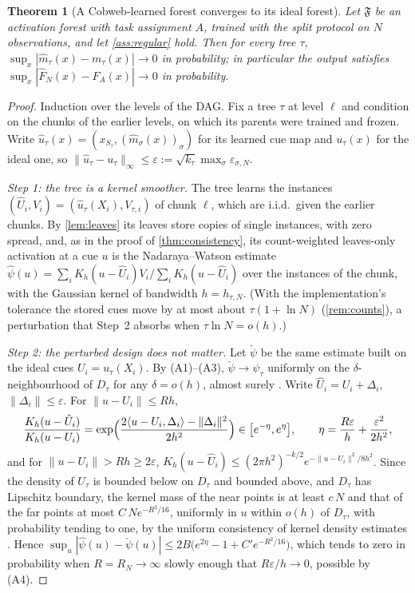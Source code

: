 \documentclass[11pt]{article}
\newtheorem{theorem}{Theorem}
\theoremstyle{definition}
\theoremstyle{remark}
\newcommand{\F}{\mathfrak{F}}
\begin{document}
\begin{theorem}[A Cobweb-learned forest converges to its ideal forest]\label{thm:ideal}
Let $\F$ be an activation forest with task assignment $A$, trained with the split
protocol on $N$ observations, and let \cref{ass:regular} hold.  Then for every tree
$\tau$, $\sup_x|\hat m_\tau(x)-m_\tau(x)|\to0$ in probability; in particular the output
satisfies $\sup_x|\hat F_N(x)-F_A(x)|\to0$ in probability.
\end{theorem}
\begin{proof}
Induction over the levels of the DAG.  Fix a tree $\tau$ at level $\ell$ and condition on
the chunks of the earlier levels, on which its parents were trained and frozen.  Write
$\hat u_\tau(x)=(x_{S_\tau},(\hat m_\sigma(x))_\sigma)$ for its learned cue map and
$u_\tau(x)$ for the ideal one, so $\|\hat u_\tau-u_\tau\|_\infty\le\varepsilon:=
\sqrt{k_\tau}\max_\sigma\varepsilon_{\sigma,N}$.

\emph{Step 1: the tree is a kernel smoother.}  The tree learns the instances
$(\hat U_i,V_i)=(\hat u_\tau(X_i),V_{\tau,i})$ of chunk $\ell$, which are i.i.d.\ given
the earlier chunks.  By \cref{lem:leaves} its leaves store copies of single instances,
with zero spread, and, as in the proof of \cref{thm:consistency}, its count-weighted
leaves-only activation at a cue $u$ is the Nadaraya--Watson estimate
$\hat\psi(u)=\sum_iK_h(u-\hat U_i)V_i/\sum_iK_h(u-\hat U_i)$ over the instances of the
chunk, with the Gaussian kernel of bandwidth $h=h_{\tau,N}$.  (With the implementation's
tolerance the stored cues move by at most about $\tau(1+\ln N)$ (\cref{rem:counts}), a
perturbation that Step~2 absorbs when $\tau\ln N=o(h)$.)

\emph{Step 2: the perturbed design does not matter.}  Let $\check\psi$ be the same
estimate built on the ideal cues $U_i=u_\tau(X_i)$.  By (A1)--(A3), $\check\psi\to\psi_\tau$
uniformly on the $\delta$-neighbourhood of $D_\tau$ for any $\delta=o(h)$, almost surely
\citep{devroye1978,mack1982}.  Write $\hat U_i=U_i+\Delta_i$, $\|\Delta_i\|\le\varepsilon$.
For $\|u-U_i\|\le Rh$,
\[
  \frac{K_h(u-\hat U_i)}{K_h(u-U_i)}=\exp\Bigl(\frac{2\langle u-U_i,\Delta_i\rangle-\|\Delta_i\|^2}{2h^2}\Bigr)
  \in\bigl[e^{-\eta},e^{\eta}\bigr],\qquad \eta=\frac{R\varepsilon}{h}+\frac{\varepsilon^2}{2h^2},
\]
and for $\|u-U_i\|>Rh\ge2\varepsilon$, $K_h(u-\hat U_i)\le(2\pi h^2)^{-k/2}
e^{-\|u-U_i\|^2/8h^2}$.  Since the density of $U_\tau$ is bounded below on $D_\tau$ and
bounded above, and $D_\tau$ has Lipschitz boundary, the kernel mass of the near points
is at least $c\,N$ and that of the far points at most $C\,Ne^{-R^2/16}$, uniformly in $u$
within $o(h)$ of $D_\tau$, with probability tending to one, by the uniform consistency
of kernel density estimates \citep{einmahl2005}.
Hence $\sup_u|\hat\psi(u)-\check\psi(u)|\le2B\bigl(e^{2\eta}-1+C'e^{-R^2/16}\bigr)$, which
tends to zero in probability when $R=R_N\to\infty$ slowly enough that
$R\varepsilon/h\to0$, possible by (A4).


\end{proof}
\end{document}
